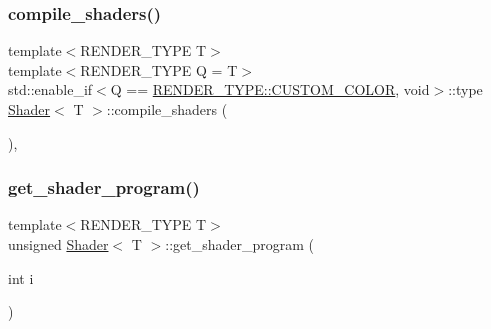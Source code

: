 \mbox{\label{classShader_a52de08866cf90ca949ece30eece06312}} 
\subsubsection{\texorpdfstring{compile\+\_\+shaders()}{compile\_shaders()}\hspace{0.1cm}{\footnotesize\ttfamily [2/2]}}
{\footnotesize\ttfamily template$<$R\+E\+N\+D\+E\+R\+\_\+\+T\+Y\+PE T$>$ \\
template$<$R\+E\+N\+D\+E\+R\+\_\+\+T\+Y\+PE Q = T$>$ \\
std\+::enable\+\_\+if$<$Q == \mbox{\hyperlink{render_8hpp_a24e288e18eb7b6e01de7565001fedb60a9d34355b5a26c54b5dbab1e45245a6f4}{R\+E\+N\+D\+E\+R\+\_\+\+T\+Y\+P\+E\+::\+C\+U\+S\+T\+O\+M\+\_\+\+C\+O\+L\+OR}}, void$>$\+::type \mbox{\hyperlink{classShader}{Shader}}$<$ T $>$\+::compile\+\_\+shaders (\begin{DoxyParamCaption}{ }\end{DoxyParamCaption})\hspace{0.3cm}{\ttfamily [inline]}, {\ttfamily [protected]}}

\mbox{\label{classShader_a2c19b216850480109f9d5f7ed6ab6aa6}} 
\subsubsection{\texorpdfstring{get\+\_\+shader\+\_\+program()}{get\_shader\_program()}}
{\footnotesize\ttfamily template$<$R\+E\+N\+D\+E\+R\+\_\+\+T\+Y\+PE T$>$ \\
unsigned \mbox{\hyperlink{classShader}{Shader}}$<$ T $>$\+::get\+\_\+shader\+\_\+program (\begin{DoxyParamCaption}\item[{int}]{i }\end{DoxyParamCaption})\hspace{0.3cm}{\ttfamily [inline]}}

\mbox{\label{classShader_a3b92fece66095389581a2bf6b3124657}} 
